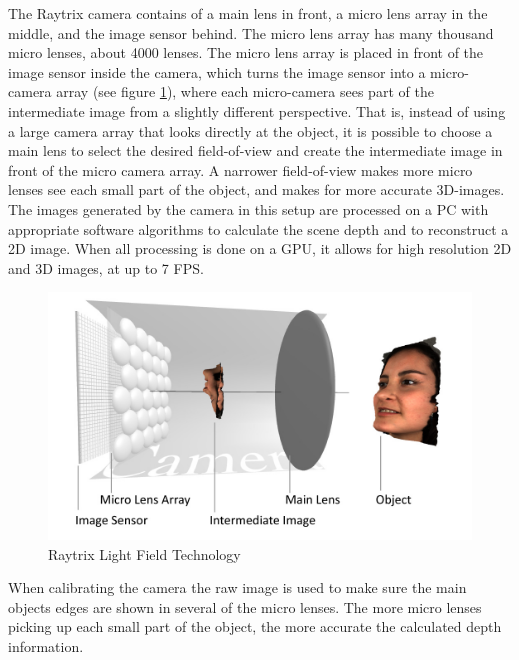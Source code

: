 The Raytrix camera contains of a main lens in front, a micro lens array in the middle, and the image sensor behind. The micro lens array has many thousand micro lenses, about 4000 lenses. The micro lens array is placed in front of the image sensor inside the camera, which turns the image sensor into a micro-camera array (see figure \ref{fig:light_field}), where each micro-camera sees part of the intermediate image from a slightly different perspective. That is, instead of using a large camera array that looks directly at the object, it is possible to choose a main lens to select the desired field-of-view and create the intermediate image in front of the micro camera array. A narrower field-of-view makes more micro lenses see each small part of the object, and makes for more accurate 3D-images. The images generated by the camera in this setup are processed on a PC with appropriate software algorithms to calculate the scene depth and to reconstruct a 2D image. When all processing is done on a GPU, it allows for high resolution 2D and 3D images, at up to 7 FPS.\cite{website:raytrix_technology}

\begin{figure}[h]
    \centering
    \includegraphics[width=.9\linewidth]{images/hardware/Light-Field-Camera-Schematic}
    \caption{Raytrix Light Field Technology\cite{website:raytrix_technology}}
    \label{fig:light_field}
\end{figure}

When calibrating the camera the raw image is used to make sure the main objects edges are shown in several of the micro lenses. The more micro lenses picking up each small part of the object, the more accurate the calculated depth information. 

